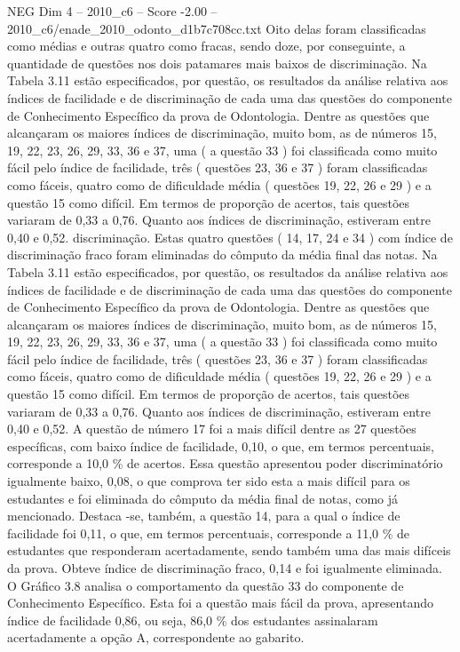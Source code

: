 \begin{textsample}{NEG Dim 4 – 2010\_c6 – Score -2.00 – 2010\_c6/enade\_2010\_odonto\_d1b7c708cc.txt}
Oito delas foram classificadas como médias e outras quatro como fracas, sendo doze, por conseguinte, a quantidade de questões nos dois patamares mais baixos de discriminação.
Na Tabela 3.11 estão especificados, por questão, os resultados da análise relativa aos índices de facilidade e de discriminação de cada uma das questões do componente de Conhecimento Específico da prova de Odontologia.
Dentre as questões que alcançaram os maiores índices de discriminação, muito bom, as de números 15, 19, 22, 23, 26, 29, 33, 36 e 37, uma ( a questão 33 ) foi classificada como muito fácil pelo índice de facilidade, três ( questões 23, 36 e 37 ) foram classificadas como fáceis, quatro como de dificuldade média ( questões 19, 22, 26 e 29 ) e a questão 15 como difícil.
Em termos de proporção de acertos, tais questões variaram de 0,33 a 0,76.
Quanto aos índices de discriminação, estiveram entre 0,40 e 0,52. discriminação.
Estas quatro questões ( 14, 17, 24 e 34 ) com índice de discriminação fraco foram eliminadas do cômputo da média final das notas.
Na Tabela 3.11 estão especificados, por questão, os resultados da análise relativa aos índices de facilidade e de discriminação de cada uma das questões do componente de Conhecimento Específico da prova de Odontologia.
Dentre as questões que alcançaram os maiores índices de discriminação, muito bom, as de números 15, 19, 22, 23, 26, 29, 33, 36 e 37, uma ( a questão 33 ) foi classificada como muito fácil pelo índice de facilidade, três ( questões 23, 36 e 37 ) foram classificadas como fáceis, quatro como de dificuldade média ( questões 19, 22, 26 e 29 ) e a questão 15 como difícil.
Em termos de proporção de acertos, tais questões variaram de 0,33 a 0,76.
Quanto aos índices de discriminação, estiveram entre 0,40 e 0,52.
A questão de número 17 foi a mais difícil dentre as 27 questões específicas, com baixo índice de facilidade, 0,10, o que, em termos percentuais, corresponde a 10,0 \% de acertos.
Essa questão apresentou poder discriminatório igualmente baixo, 0,08, o que comprova ter sido esta a mais difícil para os estudantes e foi eliminada do cômputo da média final de notas, como já mencionado.
Destaca -se, também, a questão 14, para a qual o índice de facilidade foi 0,11, o que, em termos percentuais, corresponde a 11,0 \% de estudantes que responderam acertadamente, sendo também uma das mais difíceis da prova.
Obteve índice de discriminação fraco, 0,14 e foi igualmente eliminada.
O Gráfico 3.8 analisa o comportamento da questão 33 do componente de Conhecimento Específico.
Esta foi a questão mais fácil da prova, apresentando índice de facilidade 0,86, ou seja, 86,0 \% dos estudantes assinalaram acertadamente a opção A, correspondente ao gabarito.

\end{textsample}
